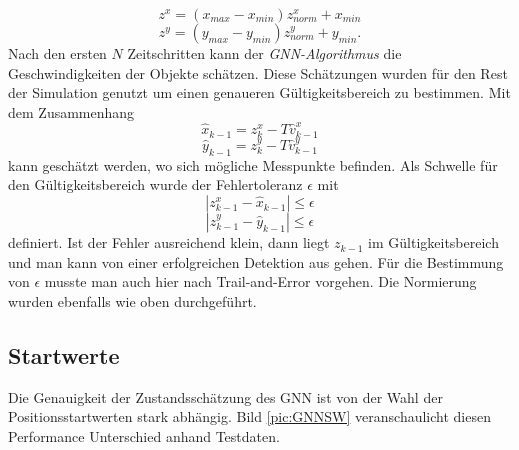 \documentclass[10pt,a4paper]{article}
\begin{document}
	\begin{equation}
		z^x=(x_{max}-x_{min})z^x_{norm}+x_{min}
	\end{equation}
	\begin{equation*}
		z^y=(y_{max}-y_{min})z^y_{norm}+y_{min}.
	\end{equation*}
	\newline
	Nach den ersten $N$ Zeitschritten kann der \textit{GNN-Algorithmus} die Geschwindigkeiten der Objekte schätzen. Diese Schätzungen wurden für den Rest der Simulation genutzt um einen genaueren Gültigkeitsbereich zu bestimmen. Mit dem Zusammenhang
	\begin{equation}
		\hat{x}_{k-1}=z^x_k-T\hat{v}^x_{k-1}
	\end{equation}
	\begin{equation*}
		\hat{y}_{k-1}=z^y_k-T\hat{v}^y_{k-1}
	\end{equation*}
	\newline
	kann geschätzt werden, wo sich mögliche Messpunkte befinden. Als Schwelle  für den Gültigkeitsbereich wurde der Fehlertoleranz $\epsilon$ mit
	\begin{equation}
		|z^x_{k-1}-\hat{x}_{k-1}|\leq \epsilon
	\end{equation}
	\begin{equation*}
		|z^y_{k-1}-\hat{y}_{k-1}|\leq \epsilon
	\end{equation*}
	\newline
	definiert. Ist der Fehler ausreichend klein, dann liegt $z_{k-1}$ im Gültigkeitsbereich und man kann von einer erfolgreichen Detektion aus gehen. Für die Bestimmung von $\epsilon$ musste man auch hier nach Trail-and-Error vorgehen. Die Normierung wurden ebenfalls wie oben durchgeführt.


\subsection{Startwerte}
Die Genauigkeit der Zustandsschätzung des GNN ist von der Wahl der Positionsstartwerten stark abhängig. Bild \ref{pic:GNNSW} veranschaulicht diesen Performance Unterschied anhand  Testdaten. \\
\end{document}

